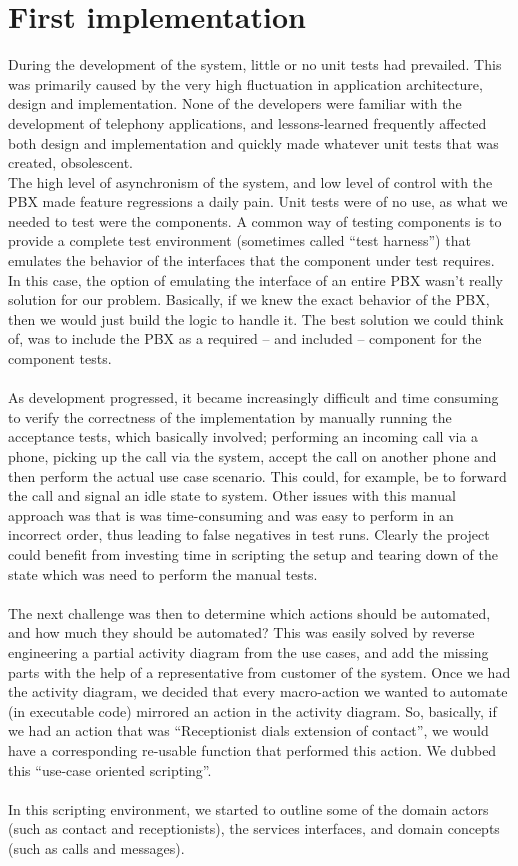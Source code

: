 \section{First implementation}
During the development of the system, little or no unit tests had prevailed. This  was primarily caused by the very high fluctuation in application architecture, design and implementation. None of the developers were familiar with the development of telephony applications, and lessons-learned frequently affected both design and implementation and quickly made whatever unit tests that was created, obsolescent.\\
The high level of asynchronism of the system, and low level of control with the PBX made feature regressions a daily pain. Unit tests were of no use, as what we needed to test were the components. A common way of testing components is to provide a complete test environment (sometimes called ``test harness'') that emulates the behavior of the interfaces that the component under test requires. In this case, the option of emulating the interface of an entire PBX wasn't really solution for our problem. Basically, if we knew the exact behavior of the PBX, then we would just build the logic to handle it. The best solution we could think of, was to include the PBX as a required -- and included -- component for the component tests.\\\\
As development progressed, it became increasingly difficult and time consuming to verify the correctness of the implementation by manually running the acceptance tests, which basically involved; performing an incoming call via a phone, picking up the call via the system, accept the call on another phone and then perform the actual use case scenario. This could, for example, be to forward the call and signal an idle state to system. Other issues with this manual approach was that is was time-consuming and was easy to perform in an incorrect order, thus leading to false negatives in test runs. Clearly the project could benefit from investing time in scripting the setup and tearing down of the state which was need to perform the manual tests.\\\\
The next challenge was then to determine which actions should be automated, and how much they should be automated? This was easily solved by reverse engineering a partial activity diagram from the use cases, and add the missing parts with the help of a representative from customer of the system. Once we had the activity diagram, we decided that every macro-action we wanted to automate (in executable code) mirrored an action in the activity diagram. So, basically, if we had an action that was ``Receptionist dials extension of contact'', we would have a corresponding re-usable function that performed this action. We dubbed this ``use-case oriented scripting''.\\\\
In this scripting environment, we started to outline some of the domain actors (such as contact and receptionists), the services interfaces, and domain concepts (such as calls and messages).

